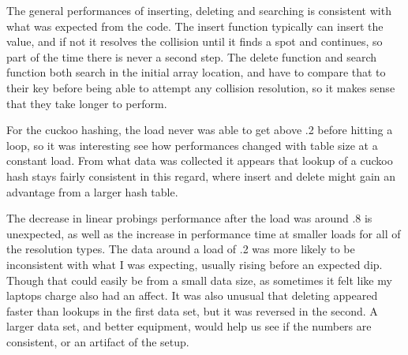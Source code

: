 \documentclass[11pt]{article}
\theoremstyle{definition}
\numberwithin{equation}{section}
\begin{document}
	The general performances of inserting, deleting and searching is consistent with what was expected from the code. The insert function typically can insert the value, and if not it resolves the collision until it finds a spot and continues, so part of the time there is never a second step. The delete function and search function both search in the initial array location, and have to compare that to their key before being able to attempt any collision resolution, so it makes sense that they take longer to perform. 
	
For the cuckoo hashing, the load never was able to get above .2 before hitting a loop, so it was interesting see how performances changed with table size at a constant load. From what data was collected it appears that lookup of a cuckoo hash stays fairly consistent in this regard, where insert and delete might gain an advantage from a larger hash table.
	
	The decrease in linear probings performance after the load was around .8 is unexpected, as well as the increase in performance time at smaller loads for all of the resolution types. The data around a load of .2 was more likely to be inconsistent with what I was expecting, usually rising before an expected dip. Though that could easily be from a small data size, as sometimes it felt like my laptops charge also had an affect. It was also unusual that deleting appeared faster than lookups in the first data set, but it was reversed in the second. A larger data set, and better equipment, would help us see if the numbers are consistent, or an artifact of the setup.
\end{document}

